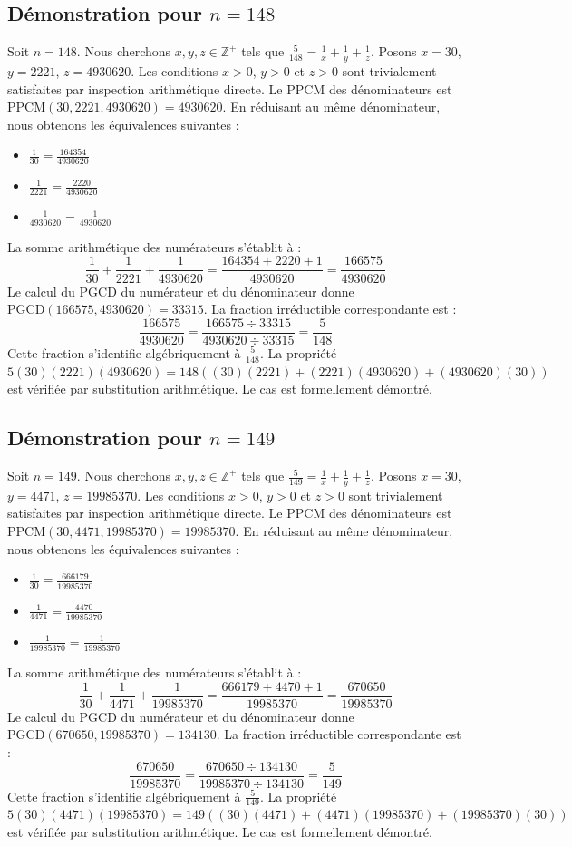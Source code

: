 \documentclass[12pt,a4paper]{article}
\begin{document}
\subsection{Démonstration pour $n = 148$}
Soit $n = 148$. Nous cherchons $x, y, z \in \mathbb{Z}^{+}$ tels que $\frac{5}{148} = \frac{1}{x} + \frac{1}{y} + \frac{1}{z}$.
Posons $x = 30$, $y = 2221$, $z = 4930620$.
Les conditions $x > 0$, $y > 0$ et $z > 0$ sont trivialement satisfaites par inspection arithmétique directe.
Le PPCM des dénominateurs est $\text{PPCM}(30, 2221, 4930620) = 4930620$.
En réduisant au même dénominateur, nous obtenons les équivalences suivantes :
\begin{itemize}
    \item $\frac{1}{30} = \frac{164354}{4930620}$
    \item $\frac{1}{2221} = \frac{2220}{4930620}$
    \item $\frac{1}{4930620} = \frac{1}{4930620}$
\end{itemize}
La somme arithmétique des numérateurs s'établit à :
$$ \frac{1}{30} + \frac{1}{2221} + \frac{1}{4930620} = \frac{164354 + 2220 + 1}{4930620} = \frac{166575}{4930620} $$
Le calcul du PGCD du numérateur et du dénominateur donne $\text{PGCD}(166575, 4930620) = 33315$.
La fraction irréductible correspondante est :
$$ \frac{166575}{4930620} = \frac{166575 \div 33315}{4930620 \div 33315} = \frac{5}{148} $$
Cette fraction s'identifie algébriquement à $\frac{5}{148}$.
La propriété $5(30)(2221)(4930620) = 148((30)(2221) + (2221)(4930620) + (4930620)(30))$ est vérifiée par substitution arithmétique.
Le cas est formellement démontré.

\subsection{Démonstration pour $n = 149$}
Soit $n = 149$. Nous cherchons $x, y, z \in \mathbb{Z}^{+}$ tels que $\frac{5}{149} = \frac{1}{x} + \frac{1}{y} + \frac{1}{z}$.
Posons $x = 30$, $y = 4471$, $z = 19985370$.
Les conditions $x > 0$, $y > 0$ et $z > 0$ sont trivialement satisfaites par inspection arithmétique directe.
Le PPCM des dénominateurs est $\text{PPCM}(30, 4471, 19985370) = 19985370$.
En réduisant au même dénominateur, nous obtenons les équivalences suivantes :
\begin{itemize}
    \item $\frac{1}{30} = \frac{666179}{19985370}$
    \item $\frac{1}{4471} = \frac{4470}{19985370}$
    \item $\frac{1}{19985370} = \frac{1}{19985370}$
\end{itemize}
La somme arithmétique des numérateurs s'établit à :
$$ \frac{1}{30} + \frac{1}{4471} + \frac{1}{19985370} = \frac{666179 + 4470 + 1}{19985370} = \frac{670650}{19985370} $$
Le calcul du PGCD du numérateur et du dénominateur donne $\text{PGCD}(670650, 19985370) = 134130$.
La fraction irréductible correspondante est :
$$ \frac{670650}{19985370} = \frac{670650 \div 134130}{19985370 \div 134130} = \frac{5}{149} $$
Cette fraction s'identifie algébriquement à $\frac{5}{149}$.
La propriété $5(30)(4471)(19985370) = 149((30)(4471) + (4471)(19985370) + (19985370)(30))$ est vérifiée par substitution arithmétique.
Le cas est formellement démontré.
\end{document}
